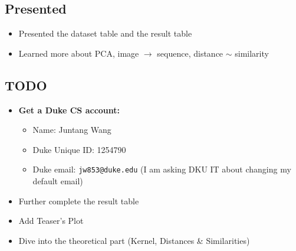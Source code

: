 
\begin{multicols}{2}

\subsection*{Presented}
\begin{itemize}
    \item Presented the dataset table and the result table
    \item Learned more about PCA, image $\rightarrow$ sequence, distance $\sim$ similarity
\end{itemize}

\columnbreak %

\subsection*{TODO}
\begin{itemize}
    \item \textbf{Get a Duke CS account:}
    \begin{itemize}
        \item Name: Juntang Wang
        \item Duke Unique ID: 1254790
        \item Duke email: \texttt{jw853@duke.edu} (I am asking DKU IT about changing my default email)
    \end{itemize}
    \item Further complete the result table
    \item Add Teaser’s Plot
    \item Dive into the theoretical part (Kernel, Distances \& Similarities)
\end{itemize}

\end{multicols}


\newpage
